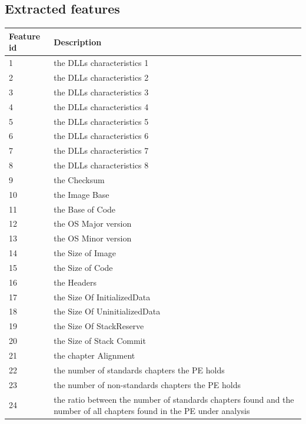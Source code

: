\begin{appendix}
\renewcommand{\thesection}{\Alph{section}}
\chapter{Extracted features}
\label{extracted_features}
\begin{longtable}{|l|p{12cm}|}
    \hline
    \textbf{Feature id} & \textbf{Description} \\
    \hline
    1 & the DLLs characteristics 1 \\
    \hline
    2 & the DLLs characteristics 2 \\
    \hline
    3 & the DLLs characteristics 3 \\
    \hline
    4 & the DLLs characteristics 4 \\
    \hline
    5 & the DLLs characteristics 5 \\
    \hline
    6 & the DLLs characteristics 6 \\
    \hline
    7 & the DLLs characteristics 7 \\
    \hline
    8 & the DLLs characteristics 8 \\
    \hline
    9 & the Checksum \\
    \hline
    10 & the Image Base \\
    \hline
    11 & the Base of Code\\
    \hline
    12 & the OS Major version\\
    \hline
    13 & the OS Minor version\\
    \hline
    14 & the Size of Image\\
    \hline
    15 & the Size of Code\\
    \hline
    16 & the Headers\\
    \hline
    17 & the Size Of InitializedData\\
    \hline
    18 & the Size Of UninitializedData\\
    \hline
    19 & the Size Of StackReserve\\
    \hline
    20 & the Size of Stack Commit\\
    \hline
    21 & the chapter Alignment\\
    \hline
    22 & the number of standards chapters the PE holds\\
    \hline
    23 & the number of non-standards chapters the PE holds\\
    \hline
    24 & the ratio between the number of standards chapters found and the number of all chapters found in the PE under analysis\\

\end{longtable}
\end{appendix}
